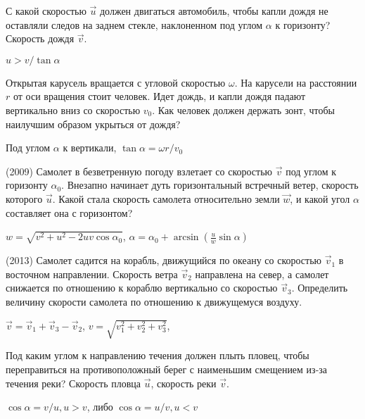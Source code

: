 \begin{ex}
С какой скоростью $\vec u$ должен двигаться автомобиль, чтобы капли дождя не оставляли следов на заднем стекле, наклоненном под углом $ \alpha $ к горизонту? Скорость дождя $\vec v$.
\begin{ans}
$u > v / \tan \alpha$
\end{ans}
\end{ex}

\begin{ex}
Открытая карусель вращается с угловой скоростью $\omega $. На карусели на расстоянии $r$ от оси вращения стоит человек. 
Идет дождь, и капли дождя падают вертикально вниз со скоростью $v_0$. 
Как человек должен держать зонт, чтобы наилучшим образом укрыться от дождя?
\begin{ans}
Под углом $\alpha$ к вертикали, $\tan \alpha = \omega r / v_0$
\end{ans}
\end{ex}

\begin{ex}
(2009) Самолет в безветренную погоду взлетает со скоростью $\vec v$  под углом к горизонту $\alpha_0$. Внезапно начинает дуть горизонтальный встречный ветер, скорость которого $\vec u$. Какой стала скорость самолета относительно земли $\vec w$, и какой угол $\alpha$ составляет она с горизонтом?
\begin{ans}
$w = \sqrt{v^2 + u^2 - 2uv\cos \alpha_0}$,
$\alpha = \alpha_0 + \arcsin \left( \frac{u}{w} \sin \alpha \right)$
\end{ans}
\end{ex}

\begin{ex}
(2013) Самолет садится на корабль, движущийся по океану со скоростью $\vec{v}_1$ в восточном направлении. 
Скорость ветра $\vec{v}_2$ направлена на север, а самолет снижается по отношению к кораблю вертикально со скоростью $\vec{v}_3$. 
Определить величину скорости самолета по отношению к движущемуся воздуху.
\begin{ans}
$\vec{v} = \vec{v}_1 + \vec{v}_3 - \vec{v}_2$, 
$v = \sqrt{v_1^2 + v_2^2 + v_3^2}$, 
\end{ans}
\end{ex}

\begin{ex}
Под каким углом к направлению течения должен плыть пловец, 
чтобы переправиться на противоположный берег с наименьшим смещением из-за течения реки? 
Скорость пловца $\vec u$, скорость реки $\vec v$.
\begin{ans}
$\cos \alpha = v/u, u > v$, либо $\cos \alpha = u/v, u < v$
\end{ans}
\end{ex}

